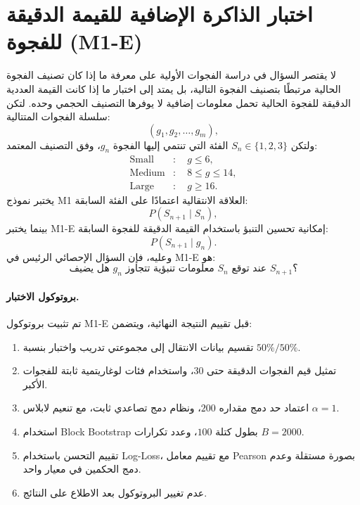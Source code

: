 \documentclass[12pt,a4paper]{article}
\begin{document}
\section{اختبار الذاكرة الإضافية للقيمة الدقيقة للفجوة (\textenglish{M1-E})}
لا يقتصر السؤال في دراسة الفجوات الأولية على معرفة ما إذا كان تصنيف الفجوة الحالية مرتبطًا بتصنيف الفجوة التالية، بل يمتد إلى اختبار ما إذا كانت القيمة العددية الدقيقة للفجوة الحالية تحمل معلومات إضافية لا يوفرها التصنيف الحجمي وحده.
لتكن سلسلة الفجوات المتتالية:
\[
(g_1,g_2,\ldots,g_m),
\]
ولتكن \(S_n\in\{1,2,3\}\) الفئة التي تنتمي إليها الفجوة \(g_n\)، وفق التصنيف المعتمد:
\[
\begin{aligned}
\text{Small}&:\quad g\leq6,\\
\text{Medium}&:\quad 8\leq g\leq14,\\
\text{Large}&:\quad g\geq16.
\end{aligned}
\]
يختبر نموذج \textenglish{M1} العلاقة الانتقالية اعتمادًا على الفئة السابقة:
\[
P(S_{n+1}\mid S_n),
\]
بينما يختبر \textenglish{M1-E} إمكانية تحسين التنبؤ باستخدام القيمة الدقيقة للفجوة السابقة:
\[
P(S_{n+1}\mid g_n).
\]
وعليه، فإن السؤال الإحصائي الرئيس في \textenglish{M1-E} هو:
\[
\boxed{
\text{هل يضيف }g_n\text{ معلومات تنبؤية تتجاوز }
S_n\text{ عند توقع }S_{n+1}؟
}
\]
\paragraph{بروتوكول الاختبار.}
تم تثبيت بروتوكول \textenglish{M1-E} قبل تقييم النتيجة النهائية، ويتضمن:
\begin{enumerate}
    \item تقسيم بيانات الانتقال إلى مجموعتي تدريب واختبار بنسبة \(50\%/50\%\).
    \item تمثيل قيم الفجوات الدقيقة حتى \(30\)، واستخدام فئات لوغاريتمية ثابتة للفجوات الأكبر.
    \item اعتماد حد دمج مقداره \(200\)، ونظام دمج تصاعدي ثابت، مع تنعيم لابلاس \(\alpha=1\).
    \item استخدام \textenglish{Block Bootstrap} بطول كتلة \(100\)، وعدد تكرارات \(B=2000\).
    \item تقييم التحسن باستخدام \textenglish{Log-Loss}، مع تقييم معامل \textenglish{Pearson} بصورة مستقلة وعدم دمج الحكمين في معيار واحد.
    \item عدم تغيير البروتوكول بعد الاطلاع على النتائج.
\end{enumerate}
\end{document}
